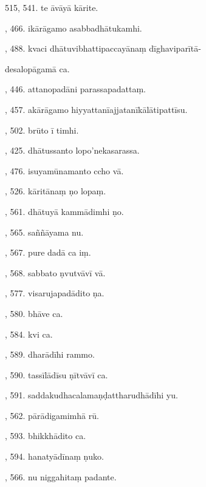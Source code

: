 515, 541. te āvāyā kārite.\hfill \pageref{sut:515}\par {}, 466. ikārāgamo asabbadhātukamhi.\hfill \pageref{sut:516}\par {}, 488. kvaci dhātuvibhattipaccayānaṃ dīghaviparītā-\par \noindent
\hspace{15mm} desalopāgamā ca.\hfill \pageref{sut:517}\par {}, 446. attanopadāni parassapadattaṃ.\hfill \pageref{sut:518}\par {}, 457. akārāgamo hiyyattanīajjatanīkālātipattīsu.\hfill \pageref{sut:519}\par {}, 502. brūto ī timhi.\hfill \pageref{sut:520}\par {}, 425. dhātussanto lopo’nekasarassa.\hfill \pageref{sut:521}\par {}, 476. isuyamūnamanto ccho vā.\hfill \pageref{sut:522}\par {}, 526. kāritānaṃ ṇo lopaṃ.\hfill \pageref{sut:523}\par {}, 561. dhātuyā kammādimhi ṇo.\hfill \pageref{sut:524}\par {}, 565. saññāyama nu.\hfill \pageref{sut:525}\par {}, 567. pure dadā ca iṃ.\hfill \pageref{sut:526}\par {}, 568. sabbato ṇvutvāvī vā.\hfill \pageref{sut:527}\par {}, 577. visarujapadādito ṇa.\hfill \pageref{sut:528}\par {}, 580. bhāve ca.\hfill \pageref{sut:529}\par {}, 584. kvi ca.\hfill \pageref{sut:530}\par {}, 589. dharādīhi rammo.\hfill \pageref{sut:531}\par {}, 590. tassīlādīsu ṇītvāvī ca.\hfill \pageref{sut:532}\par {}, 591. saddakudhacalamaṇḍattharudhādīhi yu.\hfill \pageref{sut:533}\par {}, 562. pārādigamimhā rū.\hfill \pageref{sut:534}\par {}, 593. bhikkhādito ca.\hfill \pageref{sut:535}\par {}, 594. hanatyādīnaṃ ṇuko.\hfill \pageref{sut:536}\par {}, 566. nu niggahitaṃ padante.\hfill \pageref{sut:537}\par \noindent
